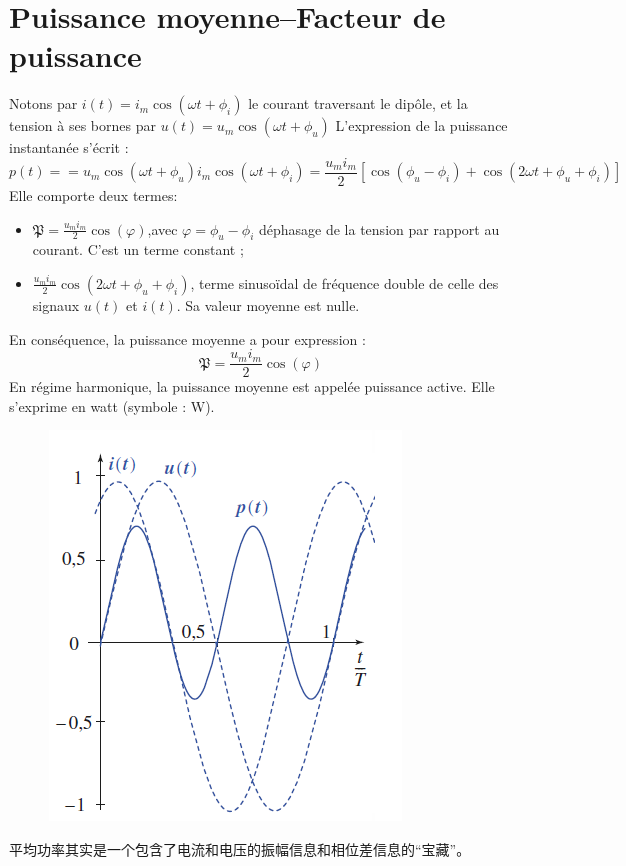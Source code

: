 \documentclass[12pt]{book}
\theoremstyle{definition}\newtheorem{dfn}{Définition}[chapter]
\theoremstyle{plain}\newtheorem{thm}{Théorème}[chapter]
\theoremstyle{plain}\newtheorem{prp}{Proposition}[chapter]
\theoremstyle{plain}\newtheorem{lem}{\bf Lemme}[chapter]
\theoremstyle{plain}\newtheorem{axm}{\bf Axiome}[chapter]
\theoremstyle{plain}\newtheorem{lmm}{\bf Lemme}[chapter]
\theoremstyle{plain}\newtheorem{cor}{\bf Corollaire}[chapter]
\theoremstyle{remark}\newtheorem{rem}{Remarque}[chapter]
\begin{document}
\section{Puissance moyenne–Facteur de puissance}
Notons par $i(t)=i_m\cos(\omega t+\phi_{i})$ le courant traversant le dipôle, et la tension
à ses bornes par $u(t)=u_m\cos(\omega t+\phi_{u})$
L'expression de la puissance instantanée s'écrit :
$$
p(t)==u_m\cos(\omega t+\phi_{u})i_m\cos(\omega t+\phi_{i})=\frac{u_mi_m}{2}[\cos(\phi_{u}-\phi_{i})+\cos(2\omega t+\phi_{u}+\phi_{i})]
$$
Elle comporte deux termes:
\begin{itemize}
\item $\mathfrak{P}=\frac{u_mi_m}{2}\cos(\varphi)$,avec
$\varphi=\phi_{u}-\phi_{i}$ déphasage de la tension par rapport au courant. C'est un terme constant ;
\item $\frac{u_mi_m}{2}\cos(2\omega t+\phi_{u}+\phi_{i})$, terme sinusoïdal de fréquence double de celle des signaux $u(t)$ et $i(t)$. Sa valeur moyenne est nulle.
\end{itemize}
En conséquence, la puissance moyenne a pour expression :
$$
\mathfrak{P}=\frac{u_mi_m}{2}\cos(\varphi)
$$
En régime harmonique, la puissance moyenne est appelée puissance active. Elle s'exprime en watt (symbole : W).
\begin{figure}[H]
	\centering
	\includegraphics[scale=1]{Regime sinusoidal force//2}
\end{figure}
平均功率其实是一个包含了电流和电压的振幅信息和相位差信息的“宝藏”。
\end{document}

